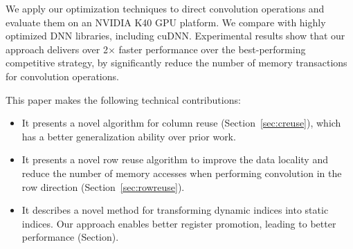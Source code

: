 
We apply our optimization techniques to direct convolution operations and evaluate them on an NVIDIA K40 GPU platform.
We compare with highly optimized DNN libraries, including cuDNN. Experimental results show that our approach delivers
over 2$\times$ faster performance over the best-performing competitive strategy, by significantly reduce the number of
memory transactions for convolution operations.

This paper makes the following technical contributions:
\begin{itemize}
  \item It presents a novel algorithm for column reuse (Section~\ref{sec:creuse}), which has a better generalization
      ability over prior work.
  \item It presents a novel row reuse algorithm to improve the data locality and reduce the number of memory accesses
      when performing convolution in the row direction (Section~\ref {sec:rowreuse}).
  \item It describes a novel method for transforming dynamic indices into static indices. Our approach enables better
      register promotion, leading to better performance (Section\FIXME{\ref{}}).
\end{itemize}
